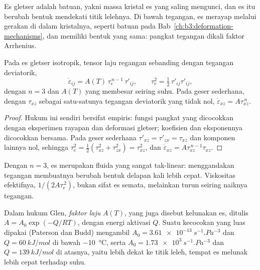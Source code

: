 Es gletser adalah batuan, yakni massa kristal es yang saling mengunci, dan es
itu berubah bentuk mendekati titik lelehnya. Di bawah tegangan, es merayap
melalui gerakan  di dalam kristalnya, seperti batuan pada
Bab~\ref{ch:b3:deformation-mechanisms}, dan  memiliki bentuk
yang sama: pangkat tegangan dikali faktor Arrhenius.

\begin{theorem}\label{thm:b3:glaciology:glen}
Pada es gletser isotropik, tensor laju regangan sebanding dengan
tegangan deviatorik,
\[
\dot\varepsilon_{ij} = A(T)\,\tau_e^{\,n-1}\,\tau'_{ij}, \qquad
\tau_e^2 = \tfrac12\,\tau'_{ij}\tau'_{ij},
\]
dengan $n = 3$ dan  $A(T)$ yang membesar seiring suhu. Pada
geser sederhana, dengan $\tau_{xz}$ sebagai satu-satunya tegangan deviatorik yang tidak nol,
$\dot\varepsilon_{xz} = A\tau_{xz}^{\,n}$.
\end{theorem}

\begin{proof}
Hukum ini sendiri bersifat empiris: fungsi pangkat yang dicocokkan dengan eksperimen rayapan dan
deformasi gletser; koefisien dan eksponennya dicocokkan
bersama. Pada geser sederhana $\tau'_{xz} = \tau'_{zx} = \tau_{xz}$ dan
komponen lainnya nol, sehingga $\tau_e^2 = \tfrac12(\tau_{xz}^2 +
\tau_{zx}^2) = \tau_{xz}^2$, dan $\dot\varepsilon_{xz} = A\tau_{xz}^{\,n-1}
\tau_{xz}$.
\end{proof}

Dengan $n = 3$, es merupakan fluida yang sangat tak-linear: menggandakan
tegangan membuatnya berubah bentuk delapan kali lebih cepat. Viskositas efektifnya, $1/(2A\tau_e^{\,2})$,
bukan sifat es semata, melainkan turun seiring naiknya tegangan.

\begin{definition}\label{def:b3:glaciology:glen}
Dalam hukum Glen, \emph{faktor laju} $A(T)$, yang juga
disebut kelunakan es, ditulis $A = A_0\exp(-Q/RT)$, dengan
energi aktivasi $Q$. Suatu kecocokan yang luas dipakai (Paterson dan Budd) mengambil $A_0 =
\qty{3.61e-13}{s^{-1}.Pa^{-3}}$ dan $Q = \qty{60}{kJ/mol}$ di bawah
\qty{-10}{\celsius}, serta $A_0 = \qty{1.73e3}{s^{-1}.Pa^{-3}}$ dan $Q =
\qty{139}{kJ/mol}$ di atasnya, yaitu lebih dekat ke titik leleh, tempat es
melunak lebih cepat terhadap suhu.
\end{definition}


